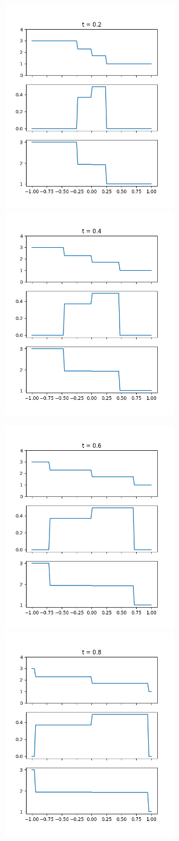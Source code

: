 \includegraphics[width=20em]{euler-roe-20.png}
\includegraphics[width=20em]{euler-roe-40.png}

\includegraphics[width=20em]{euler-roe-60.png}
\includegraphics[width=20em]{euler-roe-80.png}




